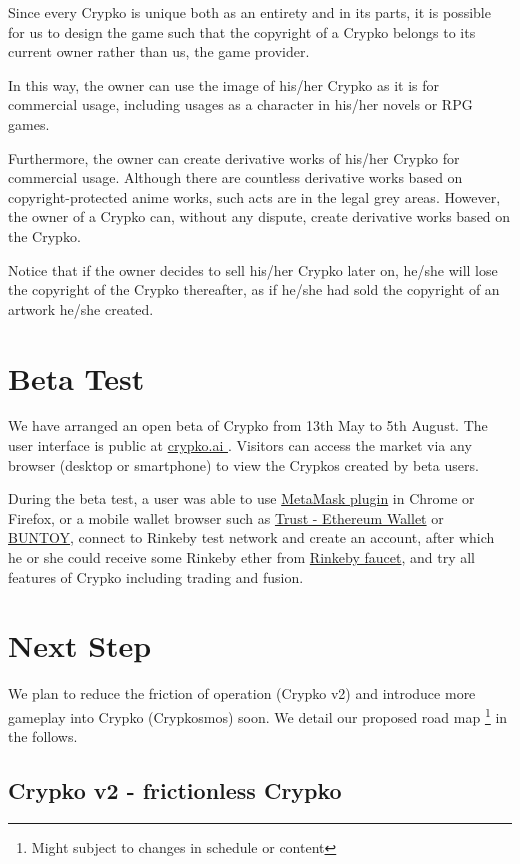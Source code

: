 \documentclass[b5paper]{article}
\begin{document}
Since every Crypko is unique both as an entirety and in its parts, it is possible for us to design the game such that the copyright of a Crypko belongs to its current owner rather than us, the game provider.

In this way, the owner can use the image of his/her Crypko as it is for commercial usage, including usages as a character in his/her novels or RPG games. 

Furthermore, the owner can create derivative works of his/her Crypko for commercial usage.
Although there are countless derivative works based on copyright-protected anime works, such acts are in the legal grey areas. However, the owner of a Crypko can, without any dispute, create derivative works based on the Crypko.

Notice that if the owner decides to sell his/her Crypko later on, he/she will lose the copyright of the Crypko thereafter, as if he/she had sold the copyright of an artwork he/she created.

\section{Beta Test}

We have arranged an open beta of Crypko from 13th May to 5th August. 
The user interface is public at \href{http://crypko.ai}{ crypko.ai }. Visitors can access the market via any browser (desktop or smartphone) to view the Crypkos created by beta users.

During the beta test, a user was able to use \href{https://metamask.io/}{MetaMask plugin} in Chrome or Firefox, or a mobile wallet browser such as \href{https://trustwalletapp.com/}{Trust - Ethereum Wallet} or \href{http://www.buntoy.com/} {BUNTOY}, connect to Rinkeby test network and create an account, after which he or she could receive some Rinkeby ether from \href{https://www.rinkeby.io/#faucet}{Rinkeby faucet}, and try all features of Crypko including trading and fusion.

\section{Next Step}

We plan to reduce the friction of operation (Crypko v2) and introduce more gameplay into Crypko (Crypkosmos) soon.
We detail our proposed road map \footnote{Might subject to changes in schedule or content} in the follows.

\subsection{Crypko v2 - frictionless Crypko}
\end{document}

